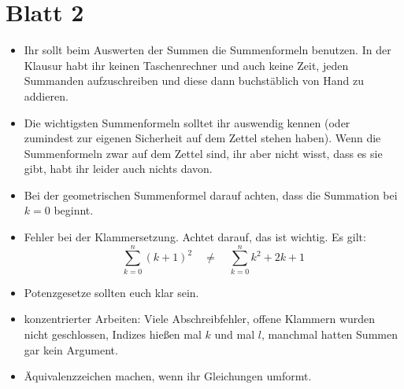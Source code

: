 \documentclass[11pt, a4paper]{article}
\begin{document}
\section*{Blatt 2}
\begin{itemize}

\item Ihr sollt beim Auswerten der Summen die Summenformeln benutzen. In der Klausur habt ihr keinen Taschenrechner und auch keine Zeit, jeden Summanden aufzuschreiben und diese dann buchstäblich von Hand zu addieren. 

\item Die wichtigsten Summenformeln solltet ihr auswendig kennen (oder zumindest zur eigenen Sicherheit auf dem Zettel stehen haben). Wenn die Summenformeln zwar auf dem Zettel sind, ihr aber nicht wisst, dass es sie gibt, habt ihr leider auch nichts davon.

\item Bei der geometrischen Summenformel darauf achten, dass die Summation bei $k = 0$ beginnt.

\item Fehler bei der Klammersetzung. Achtet darauf, das ist wichtig. Es gilt:
\begin{equation*}
\sum_{k=0}^n (k+1)^2 \quad \neq \quad \sum_{k=0}^n k^2 + 2k + 1
\end{equation*}

\item  Potenzgesetze sollten euch klar sein.

\item konzentrierter Arbeiten: Viele Abschreibfehler, offene Klammern wurden nicht geschlossen, Indizes hießen mal $k$ und mal $l$, manchmal hatten Summen gar kein Argument.

\item Äquivalenzzeichen machen, wenn ihr Gleichungen umformt. 

\end{itemize}



\newpage
\end{document}
